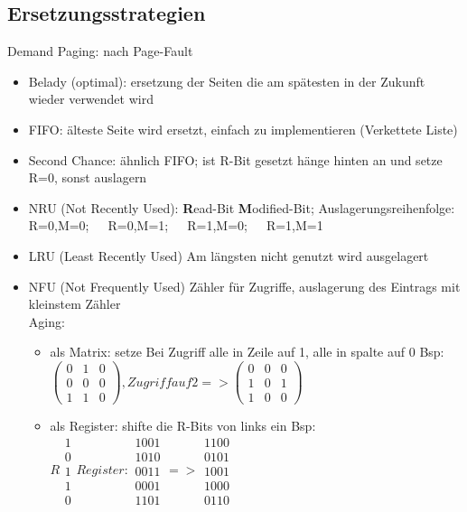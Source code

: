 \subsection*{Ersetzungsstrategien}
Demand Paging: nach Page-Fault
\begin{itemize}
\item Belady (optimal): ersetzung der Seiten die am spätesten in der Zukunft wieder verwendet wird
\item FIFO: älteste Seite wird ersetzt, einfach zu implementieren (Verkettete Liste)
\item Second Chance: ähnlich FIFO; ist R-Bit gesetzt hänge hinten an und setze R=0, sonst auslagern
\item NRU (Not Recently Used): \textbf{R}ead-Bit \textbf{M}odified-Bit; Auslagerungsreihenfolge: R=0,M=0;~~~R=0,M=1;~~~R=1,M=0;~~~R=1,M=1
\item LRU (Least Recently Used) Am längsten nicht genutzt wird ausgelagert
\item NFU (Not Frequently Used) Zähler für Zugriffe, auslagerung des Eintrags mit kleinstem Zähler\\
Aging:
\begin{itemize}
	\item als Matrix: setze Bei Zugriff alle in Zeile auf 1, alle in spalte auf 0
	Bsp: $\left( \begin{matrix}
	0 &1 &0 \\
	0 & 0& 0\\
	1 & 1 & 0
	\end{matrix} \right), Zugriff auf 2 => \left( \begin{matrix}
	0 &0 &0 \\
	1 & 0& 1\\
	1 & 0 & 0	
	\end{matrix} \right)$
	\item als Register: shifte die R-Bits von links ein
	Bsp: $R \begin{matrix}
	1\\0\\1\\1\\0
	\end{matrix} Register: \begin{matrix}
	1001\\1010\\0011\\0001\\1101
	\end{matrix}   =>  \begin{matrix}
	1100\\0101\\1001\\1000\\0110
	\end{matrix}$
\end{itemize}
\end{itemize}

